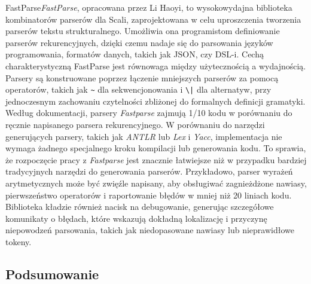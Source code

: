 FastParse\textit{FastParse}\cite{fastparse-docs}, opracowana przez Li Haoyi, to wysokowydajna biblioteka kombinatorów parserów dla Scali, zaprojektowana w celu uproszczenia tworzenia parserów tekstu strukturalnego.
Umożliwia ona programistom definiowanie parserów rekurencyjnych, dzięki czemu nadaje się do parsowania języków programowania, formatów danych, takich jak JSON, czy DSL-i.
Cechą charakterystyczną FastParse jest równowaga między użytecznością a wydajnością.
Parsery są konstruowane poprzez łączenie mniejszych parserów za pomocą operatorów, takich jak \verb&~& dla sekwencjonowania i \verb&\|& dla alternatyw, przy jednoczesnym zachowaniu czytelności zbliżonej do formalnych definicji gramatyki.
Według dokumentacji\cite{fastparse-docs}, parsery \textit{Fastparse} zajmują 1/10 kodu w porównaniu do ręcznie napisanego parsera rekurencyjnego.
W porównaniu do narzędzi generujących parsery, takich jak \textit{ANTLR} lub \textit{Lex} i \textit{Yacc}, implementacja nie wymaga żadnego specjalnego kroku kompilacji lub generowania kodu.
To sprawia, że rozpoczęcie pracy z \textit{Fastparse} jest znacznie łatwiejsze niż w przypadku bardziej tradycyjnych narzędzi do generowania parserów.
Przykładowo, parser wyrażeń arytmetycznych może być zwięźle napisany, aby obsługiwać zagnieżdżone nawiasy, pierwszeństwo operatorów i raportowanie błędów w mniej niż 20 liniach kodu\cite{fastparse-slides}.
Biblioteka kładzie również nacisk na debugowanie, generując szczegółowe komunikaty o błędach, które wskazują dokładną lokalizację i przyczynę niepowodzeń parsowania, takich jak niedopasowane nawiasy lub nieprawidłowe tokeny.

\subsection{Podsumowanie}
\label{subsec:podsumowanie}


